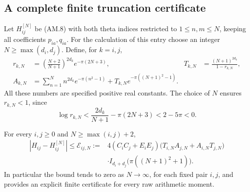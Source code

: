\subsection{A complete finite truncation certificate}

Let \(H_{ij}^{[N]}\) be (AM.8) with both theta indices restricted
to \(1\leq n,m\leq N\), keeping all coefficients \(p_{ia},q_{ia}\).
For the calculation of this entry choose an integer
\(N\geq\max(d_i,d_j)\).  Define, for \(k=i,j\),
\[
 \begin{aligned}
 r_{k,N}&=\left(\frac{N+2}{N+1}\right)^{2d_k}
                 e^{-\pi(2N+3)},&
 T_{k,N}&=\frac{(N+1)^{2d_k}}{1-r_{k,N}},\\
 A_{k,N}&=\sum_{n=1}^N n^{2d_k}e^{-\pi(n^2-1)}
       +T_{k,N}e^{-\pi((N+1)^2-1)}.
 \end{aligned}
 \tag{AM.12}
\]
All these numbers are specified positive real constants.  The
choice of \(N\) ensures \(r_{k,N}<1\), since
\[
 \log r_{k,N}
  <\frac{2d_k}{N+1}-\pi(2N+3)<2-5\pi<0.
\]

\begin{theorem}
For every \(i,j\geq0\) and \(N\geq\max(i,j)+2\),
\[
 \boxed{\begin{aligned}
 |H_{ij}-H_{ij}^{[N]}|\leq\mathcal E_{ij,N}:={}&
 4(C_iC_j+E_iE_j)
 \bigl(T_{i,N}A_{j,N}+A_{i,N}T_{j,N}\bigr)\\[-2pt]
 &\cdot I_{d_i+d_j}\bigl(\pi((N+1)^2+1)\bigr).
 \end{aligned}}
 \tag{AM.13}
\]
In particular the bound tends to zero as \(N\to\infty\), for each
fixed pair \(i,j\), and provides an explicit finite certificate
for every raw arithmetic moment.
\end{theorem}

